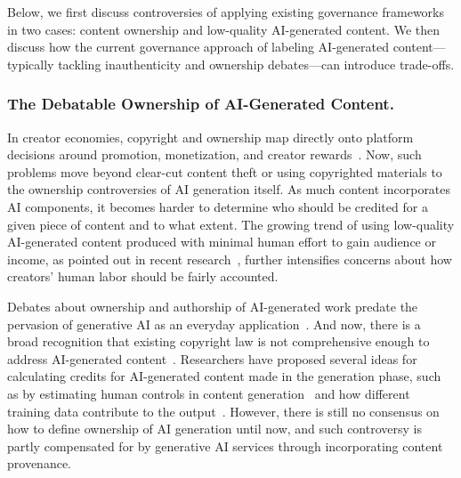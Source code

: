 Below, we first discuss controversies of applying existing governance frameworks in two cases: content ownership and low-quality AI-generated content. We then discuss how the current governance approach of labeling AI-generated content---typically tackling inauthenticity and ownership debates---can introduce trade-offs. 

\subsubsection{The Debatable Ownership of AI-Generated Content.}
\label{subsubsec:ownership}
In creator economies, copyright and ownership map directly onto platform decisions around promotion, monetization, and creator rewards~\cite{cosen2024new, chu2022behind}. Now, such problems move beyond clear-cut content theft or using copyrighted materials to the ownership controversies of AI generation itself. As much content incorporates AI components, it becomes harder to determine who should be credited for a given piece of content and to what extent. The growing trend of using low-quality AI-generated content produced with minimal human effort to gain audience or income, as pointed out in recent research~\cite{wei2024understanding,guo2025exploring, zhang2025democratizing, diresta2024spammers}, further intensifies concerns about how creators' human labor should be fairly accounted. 

Debates about ownership and authorship of AI-generated work predate the pervasion of generative AI as an everyday application~\cite{epstein2020gets}. And now, there is a broad recognition that existing copyright law is not comprehensive enough to address AI-generated content~\cite{samuelson2023generative}. Researchers have proposed several ideas for calculating credits for AI-generated content made in the generation phase, such as by estimating human controls in content generation~\cite{10.1145/3715336.3735683} and how different training data contribute to the output~\cite{lee2024talkin}. However, there is still no consensus on how to define ownership of AI generation until now, and such controversy is partly compensated for by generative AI services through incorporating content provenance.%


